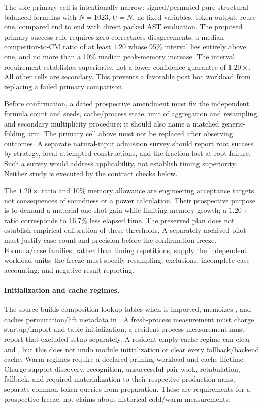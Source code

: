 \documentclass[10pt]{article}
\theoremstyle{plain}
\theoremstyle{definition}
\theoremstyle{remark}
\begin{document}
The sole primary cell is intentionally narrow: signed/permuted pure-structural balanced formulas with $N=1023$, $U=N$, no fixed variables, token output, reuse one, compared end to end with direct packed AST evaluation. The proposed primary success rule requires zero correctness disagreements, a median competitor-to-CM ratio of at least $1.20$ whose 95\% interval lies entirely above one, and no more than a 10\% median peak-memory increase. The interval requirement establishes superiority, not a lower confidence guarantee of $1.20\times$. All other cells are secondary. This prevents a favorable post hoc workload from replacing a failed primary comparison.

Before confirmation, a dated prospective amendment must fix the independent formula count and seeds, cache/process state, unit of aggregation and resampling, and secondary multiplicity procedure; it should also name a matched generic-folding arm. The primary cell above must not be replaced after observing outcomes. A separate natural-input admission survey should report root success by strategy, local attempted constructions, and the fraction lost at root failure. Such a survey would address applicability, not establish timing superiority. Neither study is executed by the contract checks below.

The $1.20\times$ ratio and 10\% memory allowance are engineering acceptance targets, not consequences of soundness or a power calculation. Their prospective purpose is to demand a material one-shot gain while limiting memory growth; a $1.20\times$ ratio corresponds to 16.7\% less elapsed time. The preserved plan does not establish empirical calibration of these thresholds. A separately archived pilot must justify case count and precision before the confirmation freeze. Formula/case families, rather than timing repetitions, supply the independent workload units; the freeze must specify resampling, exclusions, incomplete-case accounting, and negative-result reporting.

\paragraph{Initialization and cache regimes.}
The source builds composition lookup tables when  is imported, memoizes , and caches permutation/lift metadata in . A fresh-process measurement must charge startup/import and table initialization; a resident-process measurement must report that excluded setup separately. A resident empty-cache regime can clear  and , but this does not undo module initialization or clear every fallback/backend cache. Warm regimes require a declared priming workload and cache lifetime. Charge support discovery, recognition, unsuccessful pair work, retabulation, fallback, and required materialization to their respective production arms; separate common token queries from preparation. These are requirements for a prospective freeze, not claims about historical cold/warm measurements.
\end{document}
